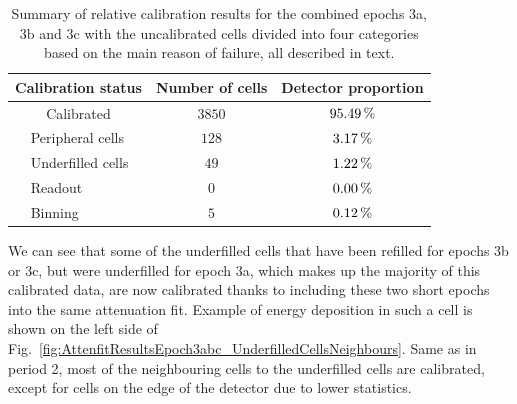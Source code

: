 \begin{table}[!hbtp]
\centering
\caption[Summary of relative calibration results for the combined epochs 3a, 3b and 3c]{Summary of relative calibration results for the combined epochs 3a, 3b and 3c with the uncalibrated cells divided into four categories based on the main reason of failure, all described in text.}
\def\arraystretch{1.4}
\begin{tabular}{|cl|c|c|}
\hline
\multicolumn{2}{|c|}{\textbf{Calibration status}} & \textbf{Number of cells} & \textbf{Detector proportion}\\\hline
\multicolumn{2}{|c|}{Calibrated} & $3850$ & $\unit[95.49]{\%}$\\\hline
\parbox[t]{2mm}{} & Peripheral cells & $128$ & $\unit[3.17]{\%}$\\
 & Underfilled cells & $49$ & $\unit[1.22]{\%}$\\
 & Readout & $0$ & $\unit[0.00]{\%}$\\
 & Binning & $5$ & $\unit[0.12]{\%}$\\\hline
\end{tabular}
\label{tab:TestBeamEp3abcRelCalibResults}
\end{table}

We can see that some of the underfilled cells that have been refilled for epochs 3b or 3c, but were underfilled for epoch 3a, which makes up the majority of this calibrated data, are now calibrated thanks to including these two short epochs into the same attenuation fit. Example of energy deposition in such a cell is shown on the left side of Fig.~\ref{fig:AttenfitResultsEpoch3abc_UnderfilledCellsNeighbours}. Same as in period 2, most of the neighbouring cells to the underfilled cells are calibrated, except for cells on the edge of the detector due to lower statistics.

